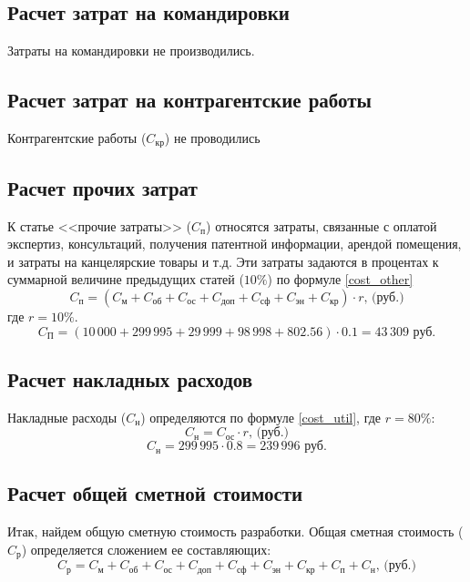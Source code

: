 \subsection{Расчет затрат на командировки}
Затраты на командировки не производились.

\subsection{Расчет затрат на контрагентские работы}
Контрагентские работы ($C_\textit{кр}$) не проводились

\subsection{Расчет прочих затрат}
К статье <<прочие затраты>> ($C_\textit{п}$) относятся затраты, связанные с оплатой экспертиз, консультаций, получения патентной информации, арендой помещения, и затраты на канцелярские товары и т.д. Эти затраты задаются в процентах к суммарной величине предыдущих статей ($10\%$) по формуле \ref{cost_other}
\begin{equation}
	C_\textit{п} = (C_\textit{м}+C_\textit{об}+C_\textit{ос}+C_\textit{доп}+C_\textit{сф}+ C_\textit{эн}+C_\textit{кр})\cdot r \mbox{, (руб.)}
	\label{cost_other}
\end{equation}
где $r=10\%$.
$$
	C_\textit{П} = (10\,000 + 299\,995 + 29\,999 + 98\,998 + 802.56)\cdot 0.1 = 43\,309 \mbox{ руб.}
$$

\subsection{Расчет накладных расходов}
Накладные расходы ($C_\textit{н}$) определяются по формуле \ref{cost_util}, где $r = 80\%$:
\begin{equation}
	C_\textit{н} = C_\textit{ос} \cdot r \mbox{, (руб.)}
	\label{cost_util}
\end{equation}
$$
	C_\textit{н} = 299\,995 \cdot 0.8 = 239\,996 \mbox{ руб.}
$$

\subsection{Расчет общей сметной стоимости}
Итак, найдем общую сметную стоимость разработки. Общая сметная стоимость ($C_\textit{р}$) определяется сложением ее составляющих:
\begin{equation}
	C_\textit{р} = C_\textit{м}+C_\textit{об}+C_\textit{ос}+C_\textit{доп}+C_\textit{сф}+ C_\textit{эн}+C_\textit{кр}+C_\textit{п}+C_\textit{н} \mbox{, (руб.)}
\end{equation}

